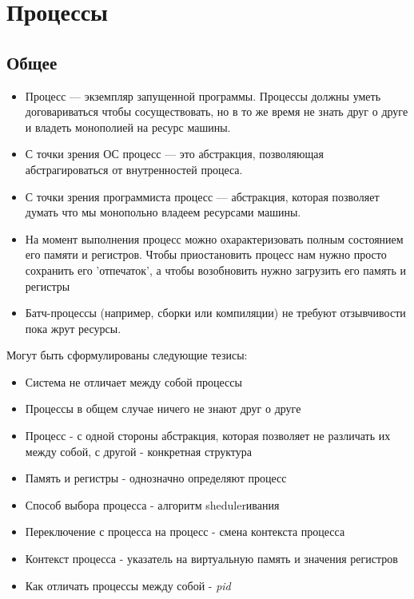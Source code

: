\documentclass[../../lectures.tex]{subfiles}
\begin{document}
\chapter{Процессы}

\section{Общее}
\begin{itemize}
    \item Процесс --- экземпляр запущенной программы. Процессы должны уметь договариваться
    чтобы сосуществовать, но в то же время не знать друг о друге и владеть
    монополией на ресурс машины. 

    \item С точки зрения ОС процесс --- это абстракция, позволяющая абстрагироваться от внутренностей процеса. 

    \item С точки зрения программиста процесс --- абстракция, 
    которая позволяет думать что мы монопольно владеем ресурсами машины.

    \item На момент выполнения процесс можно охарактеризовать полным состоянием его памяти
    и регистров. Чтобы приостановить процесс нам нужно просто сохранить его 'отпечаток', 
    а чтобы возобновить нужно загрузить его память и регистры

    \item Батч-процессы (например, сборки или компиляции) не требуют отзывчивости пока жрут ресурсы.
\end{itemize}

Могут быть сформулированы следующие тезисы:
\begin{itemize}
    \item Система не отличает между собой процессы
    \item Процессы в общем случае ничего не знают друг о друге
    \item Процесс - с одной стороны абстракция, которая позволяет не различать их 
          между собой, с другой - конкретная структура
    \item Память и регистры - однозначно определяют процесс
    \item Способ выбора процесса - алгоритм shedulerивания
    \item Переключение с процесса на процесс - смена контекста процесса
    \item Контекст процесса - указатель на виртуальную память и значения регистров
    \item Как отличать процессы между собой - \emph{pid}
\end{itemize}
\end{document}
